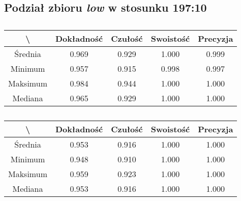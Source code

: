 \subsection{Podział zbioru \textit{low} w stosunku 197:10}


\begin{table}[H]
	\centering
	\caption{}
	\vspace{6pt}
	{\footnotesize
		\begin{tabular}{|c|c|c|c|c|}
      \hline \textbackslash & Dokładność & Czułość & Swoistość & Precyzja \\
      \hline Średnia & 0.969 & 0.929 & 1.000 & 0.999 \\
      \hline Minimum & 0.957 & 0.915 & 0.998 & 0.997 \\
      \hline Maksimum & 0.984 & 0.944 & 1.000 & 1.000 \\
      \hline Mediana & 0.965 & 0.929 & 1.000 & 1.000 \\
      \hline
    \end{tabular}
    \label{Tab:lowsplita_val}
	}
	\vspace{0pt}
\end{table}

\begin{table}[H]
	\centering
	\caption{}
	\vspace{6pt}
	{\footnotesize
		\begin{tabular}{|c|c|c|c|c|}
      \hline \textbackslash & Dokładność & Czułość & Swoistość & Precyzja \\
      \hline Średnia & 0.953 & 0.916 & 1.000 & 1.000 \\
      \hline Minimum & 0.948 & 0.910 & 1.000 & 1.000 \\
      \hline Maksimum & 0.959 & 0.923 & 1.000 & 1.000 \\
      \hline Mediana & 0.953 & 0.916 & 1.000 & 1.000 \\
      \hline
    \end{tabular}
    \label{Tab:lowsplita_test}
	}
	\vspace{0pt}
\end{table}

